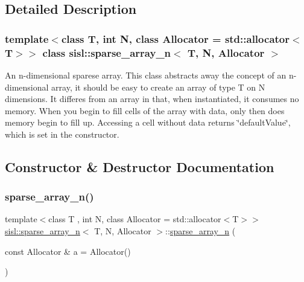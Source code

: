 \subsection{Detailed Description}
\subsubsection*{template$<$class T, int N, class Allocator = std\+::allocator$<$\+T$>$$>$\newline
class sisl\+::sparse\+\_\+array\+\_\+n$<$ T, N, Allocator $>$}

An n-\/dimensional sparese array. This class abstracts away the concept of an n-\/dimensional array, it should be easy to create an array of type T on N dimensions. It differes from an array in that, when instantiated, it consumes no memory. When you begin to fill cells of the array with data, only then does memory begin to fill up. Accessing a cell without data returns \char`\"{}default\+Value\char`\"{}, which is set in the constructor. 

\subsection{Constructor \& Destructor Documentation}
\mbox{\label{classsisl_1_1sparse__array__n_a8c957cdf94a178f0d77c1c3c374f1f91}} 
\subsubsection{\texorpdfstring{sparse\+\_\+array\+\_\+n()}{sparse\_array\_n()}\hspace{0.1cm}{\footnotesize\ttfamily [1/3]}}
{\footnotesize\ttfamily template$<$class T , int N, class Allocator  = std\+::allocator$<$\+T$>$$>$ \\
\hyperlink{classsisl_1_1sparse__array__n}{sisl\+::sparse\+\_\+array\+\_\+n}$<$ T, N, Allocator $>$\+::\hyperlink{classsisl_1_1sparse__array__n}{sparse\+\_\+array\+\_\+n} (\begin{DoxyParamCaption}\item[{const Allocator \&}]{a = {\ttfamily Allocator()} }\end{DoxyParamCaption})\hspace{0.3cm}{\ttfamily [inline]}}

